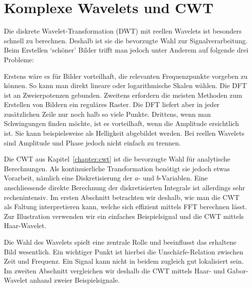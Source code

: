 %
%
%

\chapter{Komplexe Wavelets und CWT\label{chapter:complex}}
\begin{refsection}

Die diskrete Wavelet-Transformation (DWT) mit reellen Wavelets ist besonders schnell zu berechnen.
Deshalb ist sie die bevorzugte Wahl zur Signalverarbeitung.
Beim Erstellen `schöner' Bilder trifft man jedoch unter Anderem auf folgende drei Probleme:

Erstens wäre es für Bilder vorteilhaft, die relevanten Frequenzpunkte vorgeben zu können.
So kann man direkt lineare oder logarithmische Skalen wählen. Die DFT ist an Zweierpotenzen gebunden. %
Zweitens erfordern die meisten Methoden zum Erstellen von Bildern ein reguläres Raster.
Die DFT liefert aber in jeder zusätzlichen Zeile nur noch halb so viele Punkte.
Drittens, wenn man Schwingungen finden möchte, ist es vorteilhaft, wenn die Amplitude ersichtlich ist.
Sie kann beispielsweise als Helligkeit abgebildet werden. 
Bei reellen Wavelets sind Amplitude und Phase jedoch nicht einfach zu trennen.

Die CWT aus Kapitel~\ref{chapter:cwt} ist die bevorzugte Wahl für analytische Berechnungen.
Als kontinuierliche Transformation benötigt sie jedoch etwas Vorarbeit,
nämlich eine Diskretisierung der $a$- und $b$-Variablen.
Eine anschliessende direkte Berechnung der diskretisierten Integrale ist allerdings sehr rechenintensiv.
Im ersten Abschnitt betrachten wir deshalb, wie man die CWT als Faltung interpretieren kann, welche sich effizient mittels FFT berechnen lässt.
Zur Illustration verwenden wir ein einfaches Beispielsignal und die CWT mittels Haar-Wavelet.

Die Wahl des Wavelets spielt eine zentrale Rolle und beeinflusst das erhaltene Bild wesentlich.
Ein wichtiger Punkt ist hierbei die Unschärfe-Relation zwischen Zeit und Frequenz.
Ein Signal kann nicht in beidem zugleich gut lokalisiert sein.
Im zweiten Abschnitt vergleichen wir deshalb die CWT mittels Haar- und Gabor-Wavelet anhand zweier Beispielsignale.


\end{refsection}
